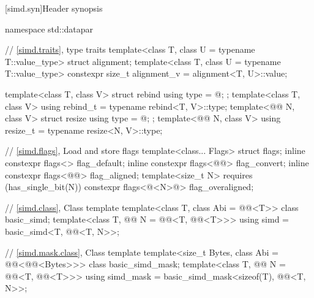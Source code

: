 [simd.syn]{Header  synopsis}
%
\begin{codeblock}
namespace std::datapar {
  // \ref{simd.traits},  type traits
  template<class T, class U = typename T::value_type> struct alignment;
  template<class T, class U = typename T::value_type>
    constexpr size_t alignment_v = alignment<T, U>::value;

  template<class T, class V> struct rebind { using type = @\seebelow@; };
  template<class T, class V> using rebind_t = typename rebind<T, V>::type;
  template<@@ N, class V> struct resize { using type = @\seebelow@; };
  template<@@ N, class V> using resize_t = typename resize<N, V>::type;

  // \ref{simd.flags}, Load and store flags
  template<class... Flags> struct flags;
  inline constexpr flags<> flag_default{};
  inline constexpr flags<@@> flag_convert{};
  inline constexpr flags<@@> flag_aligned{};
  template<size_t N> requires (has_single_bit(N))
    constexpr flags<@<N>@> flag_overaligned{};

  // \ref{simd.class}, Class template 
  template<class T, class Abi = @@<T>> class basic_simd;
  template<class T, @@ N = @@<T, @@<T>>>
    using simd = basic_simd<T, @@<T, N>>;

  // \ref{simd.mask.class}, Class template 
  template<size_t Bytes, class Abi = @@<@@<Bytes>>> class basic_simd_mask;
  template<class T, @@ N = @@<T, @@<T>>>
    using simd_mask = basic_simd_mask<sizeof(T), @@<T, N>>;

}
\end{codeblock}
